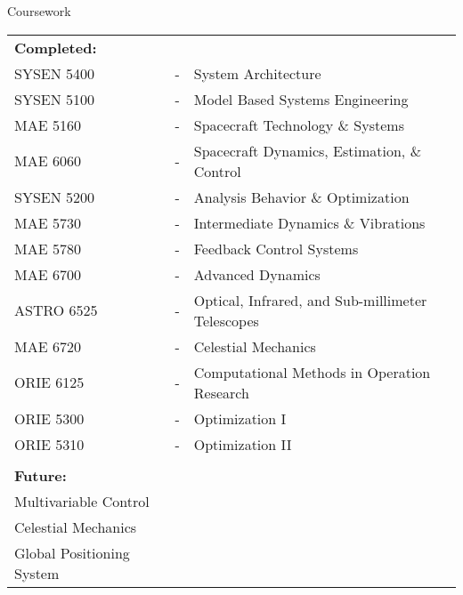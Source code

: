 \documentclass[aspectratio=169]{beamer}
\begin{document}
\begin{frame}{Coursework} %
\begin{flushleft}
\begin{tabular}{lll}
\textbf{Completed:} & & \\
SYSEN 5400 & - & System Architecture                              \\
SYSEN 5100 & - & Model Based Systems Engineering                  \\
MAE 5160   & - & Spacecraft Technology \& Systems                 \\
MAE 6060   & - & Spacecraft Dynamics, Estimation, \& Control      \\
SYSEN 5200 & - & Analysis Behavior \& Optimization                \\
MAE 5730   & - & Intermediate Dynamics \& Vibrations              \\
MAE 5780   & - & Feedback Control Systems                         \\
MAE 6700   & - & Advanced Dynamics                                \\
ASTRO 6525 & - & Optical, Infrared, and Sub-millimeter Telescopes \\
MAE 6720   & - & Celestial Mechanics                              \\
ORIE 6125  & - & Computational Methods in Operation Research      \\
ORIE 5300  & - & Optimization I                                   \\
ORIE 5310  & - & Optimization II                                  \\
& & \\
\textbf{Future:} & & \\
Multivariable Control & & \\
Celestial Mechanics & & \\
Global Positioning System & & 
\end{tabular}
\end{flushleft}
\end{frame}
\end{document}

